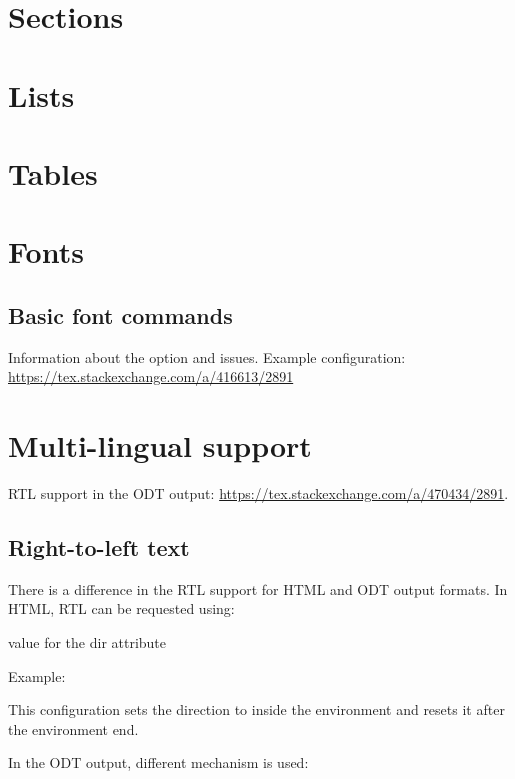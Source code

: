 \documentclass{book}
\begin{document}
\section{Sections}
\section{Lists}
\section{Tables}

\section{Fonts}
\subsection{Basic font commands}

Information about the  option and  issues. 
Example configuration:
\url{https://tex.stackexchange.com/a/416613/2891}

\section{Multi-lingual support}

RTL support in the ODT output: \url{https://tex.stackexchange.com/a/470434/2891}.

\subsection{Right-to-left text}

There is a difference in the RTL support for HTML and ODT output formats. In HTML, RTL can be requested using:

 { value for the dir attribute}\EndDoc

Example:

\begin{texsource}
{}
{}{}{}
\end{texsource}

This configuration sets the direction to  inside the  environment and resets it after the environment end.

In the ODT output, different mechanism is used:

\begin{texsource}
\end{texsource}
\end{document}
